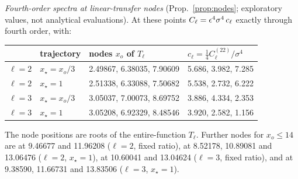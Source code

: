 \emph{Fourth-order spectra at linear-transfer nodes} (Prop.~\ref{prop:nodes}; exploratory values, not analytical evaluations). At
these points $C_\ell=\epsilon^4\sigma^4\,c_\ell$ exactly through fourth order, with:
\begin{center}
\begin{tabular}{llll}
\toprule
 & trajectory & nodes $x_o$ of $T_\ell$ & $c_\ell=\frac14C^{(22)}_\ell/\sigma^4$\\\midrule
$\ell=2$ & $x_\star=x_o/3$ & 2.49867, 6.38035, 7.90609 & 5.686, 3.982, 7.285\\
$\ell=2$ & $x_\star=1$     & 2.51338, 6.33088, 7.50682 & 5.538, 2.732, 6.222\\
$\ell=3$ & $x_\star=x_o/3$ & 3.05037, 7.00073, 8.69752 & 3.886, 4.334, 2.353\\
$\ell=3$ & $x_\star=1$     & 3.05208, 6.92329, 8.48546 & 3.920, 2.582, 1.156\\
\bottomrule
\end{tabular}
\end{center}
The node positions are roots of the entire-function $T_\ell$. Further nodes for $x_o\le14$
are at 9.46677 and 11.96208 ($\ell=2$, fixed ratio), at 8.52178, 10.89081 and 13.06476
($\ell=2$, $x_\star=1$), at 10.60041 and 13.04624 ($\ell=3$, fixed ratio), and at 9.38590,
11.66731 and 13.83506 ($\ell=3$, $x_\star=1$).

